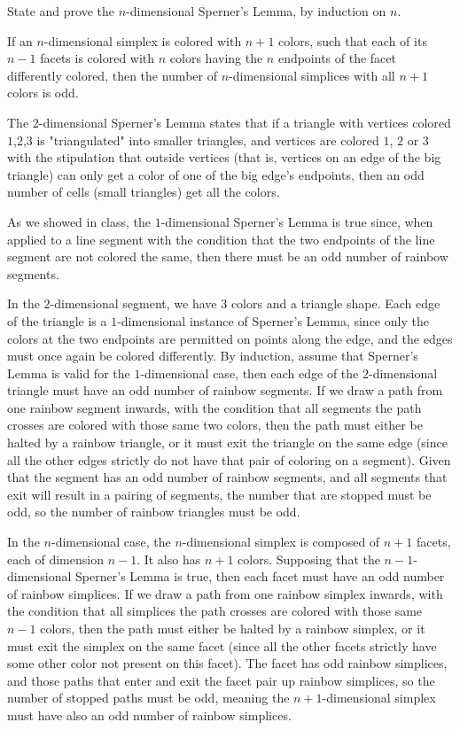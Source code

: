 \documentclass[11pt, reqno]{amsart}
\begin{document}
\newpage
\begin{problem}[13]
  State and prove the $n$-dimensional Sperner's Lemma, by induction on $n$.

  \begin{lemma}
    If an $n$-dimensional simplex is colored with $n+1$ colors,
    such that each of its $n-1$ facets is colored with $n$ colors
    having the $n$ endpoints of the facet differently colored,
    then the number of $n$-dimensional simplices with all $n+1$ colors
    is odd.
  \end{lemma}

  \step
  The $2$-dimensional Sperner's Lemma states that if a triangle with vertices colored
  $1$,$2$,$3$ is "triangulated" into smaller triangles, and vertices are colored
  $1$, $2$ or $3$ with the stipulation that outside vertices
  (that is, vertices on an edge of the big triangle) can only get a color
  of one of the big edge's endpoints, then an odd number of cells (small triangles) get all the colors.

  \step
  As we showed in class, the $1$-dimensional Sperner's Lemma is true since,
  when applied to a line segment with the condition that the two endpoints
  of the line segment are not colored the same, then there must be an odd
  number of rainbow segments.

  \step
  In the $2$-dimensional segment, we have $3$ colors and a triangle shape.
  Each edge of the triangle is a $1$-dimensional instance of Sperner's Lemma,
  since only the colors at the two endpoints are permitted on points along the edge,
  and the edges must once again be colored differently.
  By induction, assume that Sperner's Lemma is valid for the $1$-dimensional case,
  then each edge of the $2$-dimensional triangle must have an odd number of rainbow segments.
  If we draw a path from one rainbow segment inwards,
  with the condition that all segments the path crosses are colored with those same two colors,
  then the path must either be halted by a rainbow triangle,
  or it must exit the triangle on the same edge (since all the other edges
  strictly do not have that pair of coloring on a segment).
  Given that the segment has an odd number of rainbow segments,
  and all segments that exit will result in a pairing of segments, the number that
  are stopped must be odd, so the number of rainbow triangles must be odd.

  \step
  In the $n$-dimensional case, the $n$-dimensional simplex is composed of
  $n+1$ facets, each of dimension $n-1$. It also has $n+1$ colors.
  Supposing that the $n-1$-dimensional Sperner's Lemma is true,
  then each facet must have an odd number of rainbow simplices.
  If we draw a path from one rainbow simplex inwards,
  with the condition that all simplices the path crosses are colored with those same $n-1$ colors,
  then the path must either be halted by a rainbow simplex,
  or it must exit the simplex on the same facet (since all the other facets
  strictly have some other color not present on this facet).
  The facet has odd rainbow simplices, and those paths that enter and exit the facet
  pair up rainbow simplices, so the number of stopped paths must be odd, meaning the
  $n+1$-dimensional simplex must have also an odd number of rainbow simplices.

\end{problem}
\end{document}

